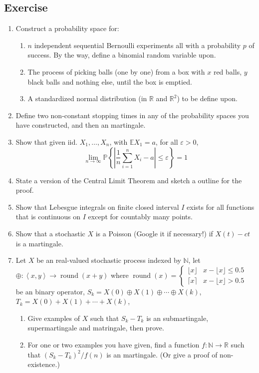 \documentclass{book}
\theoremstyle{definition}\newtheorem{mechanism}{Mechanism}
\theoremstyle{remark}\newtheorem*{remark}{Remark}
\begin{document}
\subsection*{Exercise}

\begin{enumerate}
	\item Construct a probability space for:
	\begin{enumerate}
		\item $n$ independent sequential Bernoulli experiments all with a probability $p$ of success. By the way, define a binomial random variable upon.
		\item The process of picking balls (one by one) from a box with $x$ red balls, $y$ black balls and nothing else, until the box is emptied.
		\item A standardized normal distribution (in $\mathbb R$ and $\mathbb R^2$) to be define upon.
	\end{enumerate}
	\item Define two non-constant stopping times in any of the probability spaces you have constructed, and then an martingale.
	\item Show that given iid. $X_1, \dots, X_n$, with $\mathbb E X_1 = a$, for all $\varepsilon > 0$, 
	\begin{equation*}
		\lim_{n\to \infty} \mathbb P\left\{\left|\frac1n \sum_{i = 1}^n X_i - a\right|\le \mathcal \varepsilon\right\} = 1
	\end{equation*}
	\item State a version of the Central Limit Theorem and sketch a outline for the proof.
	\item Show that Lebesgue integrals on finite closed interval $I$ exists for all functions that is continuous on $I$ except for countably many points.
	\item Show that a stochastic $X$ is a Poisson (Google it if necessary!) if $X(t) - ct$ is a martingale.
	\item Let $X$ be an real-valued stochastic process indexed by $\mathbb N$, let $\oplus: \left<x, y\right>\to \operatorname{round}(x + y)$ where $\operatorname{round}(x) = \begin{cases}
		\lfloor x\rfloor & x - \lfloor x\rfloor \le 0.5\\
		\lceil x\rceil & x - \lfloor x\rfloor > 0.5
	\end{cases}$ be an binary operator, $S_k = X(0) \oplus X(1) \oplus \cdots \oplus X(k)$, $T_k = X(0) + X(1) + \cdots + X(k)$, 
	\begin{enumerate}
		\item Give examples of $X$ such that $S_k - T_k$ is an submartingale, supermartingale and matringale, then prove.
		\item For one or two examples you have given, find a function $f: \mathbb N\to \mathbb R$ such that $(S_k - T_k)^2 / f(n)$ is an martingale. (Or give a proof of non-existence.)
	\end{enumerate}
\end{enumerate}
\end{document}
